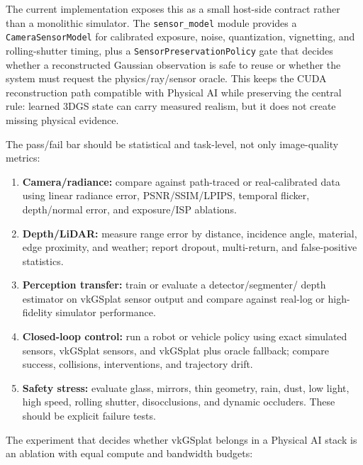 \documentclass[11pt]{article}
\begin{document}
The current implementation exposes this as a small host-side contract rather
than a monolithic simulator. The \texttt{sensor\_model} module provides a
\texttt{CameraSensorModel} for calibrated exposure, noise, quantization,
vignetting, and rolling-shutter timing, plus a
\texttt{SensorPreservationPolicy} gate that decides whether a reconstructed
Gaussian observation is safe to reuse or whether the system must request the
physics/ray/sensor oracle. This keeps the CUDA reconstruction path compatible
with Physical AI while preserving the central rule: learned 3DGS state can carry
measured realism, but it does not create missing physical evidence.

The pass/fail bar should be statistical and task-level, not only image-quality
metrics:

\begin{enumerate}
  \item \textbf{Camera/radiance:} compare against path-traced or real-calibrated
        data using linear radiance error, PSNR/SSIM/LPIPS, temporal flicker,
        depth/normal error, and exposure/ISP ablations.
  \item \textbf{Depth/LiDAR:} measure range error by distance, incidence angle,
        material, edge proximity, and weather; report dropout, multi-return, and
        false-positive statistics.
  \item \textbf{Perception transfer:} train or evaluate a detector/segmenter/
        depth estimator on vkGSplat sensor output and compare against real-log
        or high-fidelity simulator performance.
  \item \textbf{Closed-loop control:} run a robot or vehicle policy using exact
        simulated sensors, vkGSplat sensors, and vkGSplat plus oracle fallback;
        compare success, collisions, interventions, and trajectory drift.
  \item \textbf{Safety stress:} evaluate glass, mirrors, thin geometry, rain,
        dust, low light, high speed, rolling shutter, disocclusions, and dynamic
        occluders. These should be explicit failure tests.
\end{enumerate}

The experiment that decides whether vkGSplat belongs in a Physical AI stack is
an ablation with equal compute and bandwidth budgets:
\end{document}
